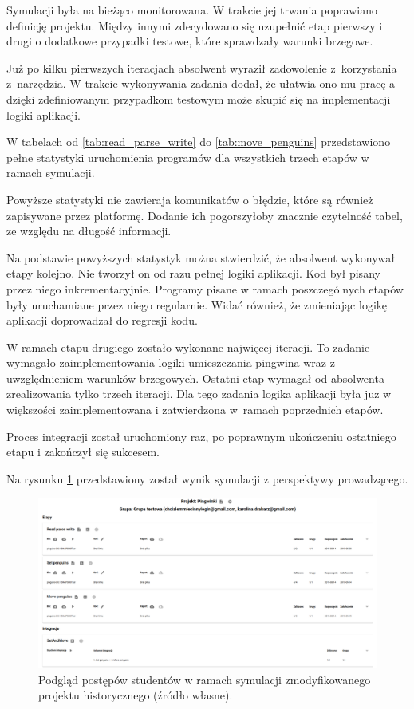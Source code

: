 Symulacji była na bieżąco monitorowana.
W trakcie jej trwania poprawiano definicję projektu.
Między innymi zdecydowano się uzupełnić etap pierwszy i drugi o dodatkowe przypadki testowe, które sprawdzały warunki brzegowe.

Już po kilku pierwszych iteracjach absolwent wyraził zadowolenie z~korzystania z~narzędzia.
W trakcie wykonywania zadania dodał, że ułatwia ono mu pracę a dzięki zdefiniowanym przypadkom testowym może skupić się na implementacji logiki aplikacji.

W tabelach od \ref{tab:read_parse_write} do \ref{tab:move_penguins} przedstawiono pełne statystyki uruchomienia programów dla wszystkich trzech etapów w ramach symulacji.









Powyższe statystyki nie zawieraja komunikatów o błędzie, które są również zapisywane przez platformę.
Dodanie ich pogorszyłoby znacznie czytelność tabel, ze względu na długość informacji.

Na podstawie powyższych statystyk można stwierdzić, że absolwent wykonywał etapy kolejno.
Nie tworzył on od razu pełnej logiki aplikacji.
Kod był pisany przez niego inkrementacyjnie.
Programy pisane w ramach poszczególnych etapów były uruchamiane przez niego regularnie.
Widać również, że zmieniając logikę aplikacji doprowadzał do regresji kodu.

W ramach etapu drugiego zostało wykonane najwięcej iteracji.
To zadanie wymagało zaimplementowania logiki umieszczania pingwina wraz z uwzględnieniem warunków brzegowych.
Ostatni etap wymagał od absolwenta zrealizowania tylko trzech iteracji.
Dla tego zadania logika aplikacji była juz w większości zaimplementowana i zatwierdzona w~ramach poprzednich etapów.

Proces integracji został uruchomiony raz, po poprawnym ukończeniu ostatniego etapu i zakończył się sukcesem.

Na rysunku \ref{fig:penguins_simulation_interface} przedstawiony został wynik symulacji z perspektywy prowadzącego.

\begin{figure}[h]
    \centering
    \includegraphics[width = 13cm]{chapter07/penguins_preview.png}
    \caption{Podgląd postępów studentów w ramach symulacji zmodyfikowanego projektu historycznego (źródło własne).}
    \label{fig:penguins_simulation_interface}
\end{figure}


